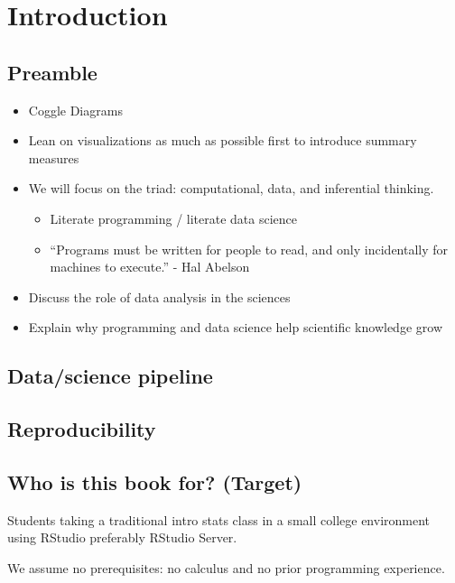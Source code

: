 \documentclass[]{tufte-book}
\providecommand{\tightlist}{%
  \setlength{\itemsep}{0pt}\setlength{\parskip}{0pt}}
\begin{document}
\chapter{Introduction}\label{intro}

\section{Preamble}\label{preamble}

\begin{itemize}
\tightlist
\item
  Coggle Diagrams
\item
  Lean on visualizations as much as possible first to introduce summary
  measures
\item
  We will focus on the triad: computational, data, and inferential
  thinking.

  \begin{itemize}
  \tightlist
  \item
    Literate programming / literate data science
  \item
    ``Programs must be written for people to read, and only incidentally
    for machines to execute.'' - Hal Abelson
  \end{itemize}
\item
  Discuss the role of data analysis in the sciences
\item
  Explain why programming and data science help scientific knowledge
  grow
\end{itemize}

\section{Data/science pipeline}\label{datascience-pipeline}

\section{Reproducibility}\label{reproducibility}

\section{Who is this book for?
(Target)}\label{who-is-this-book-for-target}

Students taking a traditional intro stats class in a small college
environment using RStudio preferably RStudio Server.

We assume no prerequisites: no calculus and no prior programming
experience.
\end{document}
